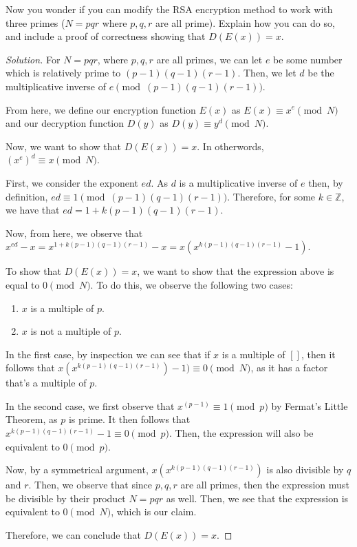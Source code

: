 \documentclass{article}
\newenvironment{solution}{\begin{proof}[Solution]}{\end{proof}}
\newcommand{\ZZ}{\mathbb{Z}}
\begin{document}
\begin{hw}
	Now you wonder if you can modify the RSA encryption method to work with three primes ($N = pqr$ where $p, q, r$ are all prime). Explain how you can do so, and include a proof of correctness showing that $D(E(x)) = x$.
\end{hw}
\begin{solution}
	For $N = pqr$, where $p,q,r$ are all primes, we can let $e$ be some number which is relatively prime to $(p-1)(q-1)(r-1)$. Then, we let $d$ be the multiplicative inverse of $e \pmod{(p-1)(q-1)(r-1)}$.

	From here, we define our encryption function $E(x)$ as $E(x) \equiv x^{e} \pmod{N}$ and our decryption function $D(y)$ as $D(y) \equiv y^{d} \pmod{N}$. 
	
	Now, we want to show that $D(E(x)) = x$. In otherwords, $(x^{e})^{d} \equiv x \pmod{N}$.
	
	First, we consider the exponent $ed$. As $d$ is a multiplicative inverse of $e$ then, by definition, $ed \equiv 1 \pmod{(p-1)(q-1)(r-1)}$. Therefore, for some $k\in\ZZ$, we have that $ed = 1 + k(p-1)(q-1)(r-1)$.
	
	Now, from here, we observe that $x^{ed} - x = x^{1 + k(p-1)(q-1)(r-1)} - x = x(x^{k(p-1)(q-1)(r-1)} - 1)$.
	
	To show that $D(E(x)) = x$, we want to show that the expression above is equal to $0 \pmod{N}$. To do this, we observe the following two cases:
	\begin{enumerate}
		\item $x$ is a multiple of $p$.
		\item $x$ is not a multiple of $p$.
	\end{enumerate}

	In the first case, by inspection we can see that if $x$ is a multiple of $[]$, then it follows that $x(x^{k(p-1)(q-1)(r-1)}) - 1) \equiv 0 \pmod{N}$, as it has a factor that's a multiple of $p$.
	
	In the second case, we first observe that $x^{(p-1)} \equiv 1 \pmod{p}$ by Fermat's Little Theorem, as $p$ is prime. It then follows that $x^{k(p-1)(q-1)(r-1)} - 1 \equiv 0 \pmod{p}$. Then, the expression will also be equivalent to $0 \pmod{p}$.
	
	Now, by a symmetrical argument, $x(x^{k(p-1)(q-1)(r-1)})$ is also divisible by $q$ and $r$. Then, we observe that since $p,q,r$ are all primes, then the expression must be divisible by their product $N = pqr$ as well. Then, we see that the expression is equivalent to $0 \pmod{N}$, which is our claim.
	
	Therefore, we can conclude that $D(E(x)) = x$.
\end{solution}
\end{document}
